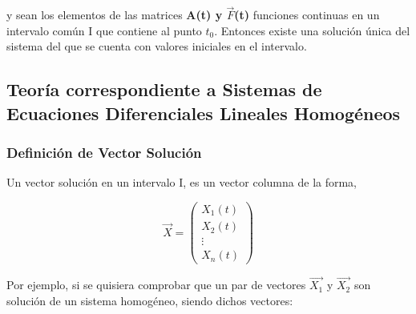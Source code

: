 \documentclass[titlepage]{article}
\begin{document}
            y sean los elementos de las matrices \textbf{A(t) y $\vec{F}$(t)} funciones continuas en un intervalo común I que contiene al punto $t_0$. Entonces existe una solución única del sistema del que se cuenta con valores iniciales en el intervalo.\cite{Zill2002a}     
            
        \subsection{Teoría correspondiente a Sistemas de Ecuaciones Diferenciales Lineales Homogéneos}\par\vspace{0.3cm} 
        
            \subsubsection{Definición de Vector Solución}
            Un vector solución en un intervalo I, es un vector columna de la forma,\par 
                
            
                    
                    \begin{equation*}
                        \vec{X} =
                        \begin{pmatrix}
                            
                            X_1(t) \\
                            X_2(t) \\
                            \vdots \\
                            X_n(t)
                        
                        \end{pmatrix} 
                    \end{equation*}
                           
            Por ejemplo, si se quisiera comprobar que un par de vectores $\vec{X_1}$ y $\vec{X_2}$ son solución de un sistema homogéneo, siendo dichos vectores:
        
\end{document}
